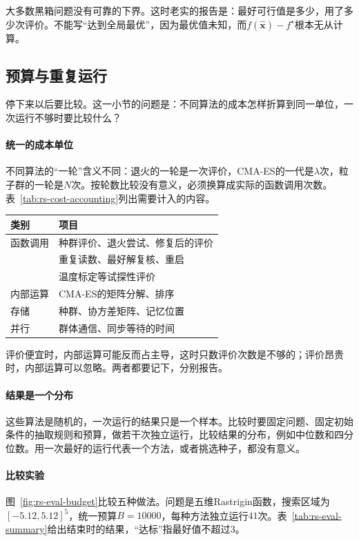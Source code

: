 大多数黑箱问题没有可靠的下界。这时老实的报告是：最好可行值是多少，用了多少次评价。不能写“达到全局最优”，因为最优值未知，而$f(\hat{\bm{x}})-f^\star$根本无从计算。

\subsection{预算与重复运行}
\label{sec:rs-eval-budget}

停下来以后要比较。这一小节的问题是：不同算法的成本怎样折算到同一单位，一次运行不够时要比较什么？

\paragraph{统一的成本单位}
不同算法的“一轮”含义不同：退火的一轮是一次评价，CMA-ES的一代是$\lambda$次，粒子群的一轮是$N$次。按轮数比较没有意义，必须换算成实际的函数调用次数。表~\ref{tab:rs-cost-accounting}列出需要计入的内容。

\begin{BookInlineTable}
 \centering
 \caption{成本的记录。第一类按评价次数统一累计，第二类另行报告。}
 \label{tab:rs-cost-accounting}
 \begin{tabular}{ll}
  \toprule
  类别 & 项目 \\
  \midrule
  函数调用 & 种群评价、退火尝试、修复后的评价 \\
  & 重复读数、最好解复核、重启 \\
  & 温度标定等试探性评价 \\
  \midrule
  内部运算 & CMA-ES的矩阵分解、排序 \\
  存储 & 种群、协方差矩阵、记忆位置 \\
  并行 & 群体通信、同步等待的时间 \\
  \bottomrule
 \end{tabular}
\end{BookInlineTable}

评价便宜时，内部运算可能反而占主导，这时只数评价次数是不够的；评价昂贵时，内部运算可以忽略。两者都要记下，分别报告。

\paragraph{结果是一个分布}
这些算法是随机的，一次运行的结果只是一个样本。比较时要固定问题、固定初始条件的抽取规则和预算，做若干次独立运行，比较结果的分布，例如中位数和四分位数。用一次最好的运行代表一个方法，或者挑选种子，都没有意义。

\paragraph{比较实验}
图~\ref{fig:rs-eval-budget}比较五种做法。问题是五维Rastrigin函数，搜索区域为$[-5.12,5.12]^5$，统一预算$B=10000$，每种方法独立运行$41$次。表~\ref{tab:rs-eval-summary}给出结束时的结果，“达标”指最好值不超过$3$。

